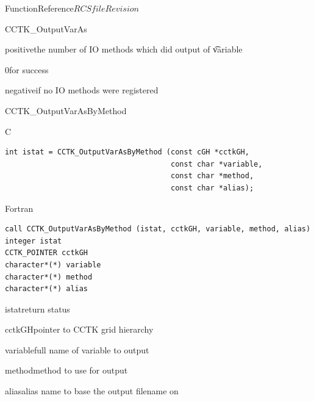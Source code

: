 \begin{cactuspart}{FunctionReference}{$RCSfile$}{$Revision$}
\begin{FunctionDescription}{CCTK\_OutputVarAs}
\begin{ErrorSection}
\begin{Error}{positive}the number of IO methods which did output of {\t variable}\end{Error}
\begin{Error}{\rm 0}for success\end{Error}
\begin{Error}{negative}if no IO methods were registered\end{Error}
\end{ErrorSection}
\end{FunctionDescription}


\begin{FunctionDescription}{CCTK\_OutputVarAsByMethod}
\label{CCTK-OutputVarAsByMethod}

\begin{SynopsisSection}
\begin{Synopsis}{C}
\begin{verbatim}
int istat = CCTK_OutputVarAsByMethod (const cGH *cctkGH,
                                      const char *variable,
                                      const char *method,
                                      const char *alias);
\end{verbatim}
\end{Synopsis}
\begin{Synopsis}{Fortran}
\begin{verbatim}
call CCTK_OutputVarAsByMethod (istat, cctkGH, variable, method, alias)
integer istat
CCTK_POINTER cctkGH
character*(*) variable
character*(*) method
character*(*) alias
\end{verbatim}
\end{Synopsis}
\end{SynopsisSection}

\begin{ParameterSection}
\begin{Parameter}{istat}return status\end{Parameter}
\begin{Parameter}{cctkGH}pointer to CCTK grid hierarchy\end{Parameter}
\begin{Parameter}{variable}full name of variable to output\end{Parameter}
\begin{Parameter}{method}method to use for output\end{Parameter}
\begin{Parameter}{alias}alias name to base the output filename on\end{Parameter}
\end{ParameterSection}


\end{FunctionDescription}
\end{cactuspart}
